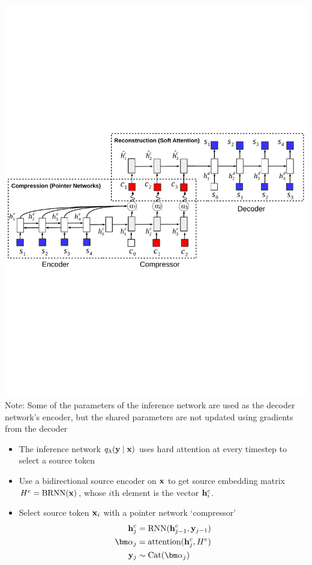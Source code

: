 \begin{frame}
\begin{center}
\end{center}
\center
\includegraphics[scale=0.5]{img/aec.pdf}
Note: Some of the parameters of the inference network
are used as the decoder network's encoder, but the shared parameters are not updated
using gradients from the decoder
\end{frame}

\begin{frame}
\begin{center}
\end{center}
\begin{itemize}
\item The inference network $q_\lambda(\mathbf{y}\mid\mathbf{x})$
uses hard attention at every timestep to select a source token
\item Use a bidirectional source encoder on $\mathbf{x}$ to get source embedding matrix
$H^e = \textrm{BRNN}(\mathbf{x})$, whose $i$th element is the vector $\mathbf{h}_i^e$.
\item Select source token $\mathbf{x}_i$ with a pointer network `compressor'
\begin{align}
\bh_j^c &= \textrm{RNN}(\bh_{j-1}^c, \by_{j-1})\\
\bm\alpha_j &= \textrm{attention}(\bh_j^c, H^e)\\
\by_j &\sim \textrm{Cat}(\bm\alpha_j)
\end{align}
\end{itemize}
\end{frame}

